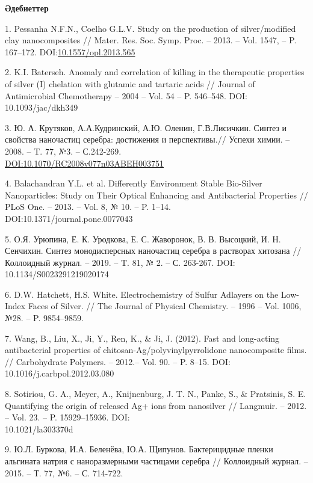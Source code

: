 \begin{center}
{\bfseries Әдебиеттер}
\end{center}

\begin{references}
1. Pessanha N.F.N., Coelho G.L.V. Study on the production of
silver/modified clay nanocomposites // Mater. Res. Soc. Symp. Proc. --
2013. -- Vol. 1547, -- P. 167--172.
DOI:\href{http://dx.doi.org/10.1557/opl.2013.565}{10.1557/opl.2013.565}

2. K.I. Baterseh. Anomaly and correlation of killing in the therapeutic
properties of silver (I) chelation with glutamic and tartaric acids //
Journal of Antimicrobial Chemotherapy -- 2004 -- Vol. 54 -- P.
546--548. DOI: 10.1093/jac/dkh349

3. Ю. А. Крутяков, А.А.Кудринский, А.Ю. Оленин, Г.В.Лисичкин. Синтез и
свойства наночастиц серебра: достижения и перспективы.// Успехи химии.
-- 2008. -- T. 77, №3. -- С.242-269.
\\\href{https://doi.org/10.1070/RC2008v077n03ABEH003751}{DOI:10.1070/RC2008v077n03ABEH003751}

4. Balachandran Y.L. et al. Differently Environment Stable Bio-Silver
Nanoparticles: Study on Their Optical Enhancing and Antibacterial
Properties // PLoS One. -- 2013. -- Vol. 8, № 10. -- P. 1--14.
\\DOI:10.1371/journal.pone.0077043

5. О.Я. Урюпина, Е. К. Уродкова, Е. С. Жаворонок, В. В. Высоцкий, И. Н.
Сенчихин. Синтез монодисперсных наночастиц серебра в растворах
хитозана // Коллоидный журнал. -- 2019. -- T. 81, № 2. -- С. 263-267.
DOI: 10.1134/S0023291219020174

6. D.W. Hatchett, H.S. White. Electrochemistry of Sulfur Adlayers on the
Low-Index Faces of Silver. // The Journal of Physical Chemistry. --
1996 -- Vol. 1006, №28. -- P. 9854--9859.

7. Wang, B., Liu, X., Ji, Y., Ren, K., \& Ji, J. (2012). Fast and
long-acting antibacterial properties of
chitosan-Ag/polyvinylpyrrolidone nanocomposite films. // Carbohydrate
Polymers. -- 2012.-- Vol. 90. -- P. 8--15. DOI:
10.1016/j.carbpol.2012.03.080

8. Sotiriou, G. A., Meyer, A., Knijnenburg, J. T. N., Panke, S., \&
Pratsinis, S. E. Quantifying the origin of released Ag+ ions from
nanosilver // Langmuir. -- 2012. -- Vol. 23. -- P. 15929--15936. DOI:
\\10.1021/la303370d

9. Ю.Л. Буркова, И.А. Беленёва, Ю.А. Щипунов. Бактерицидные пленки
альгината натрия с наноразмерными частицами серебра // Коллоидный
журнал. -- 2015. -- Т. 77, №6. -- С. 714-722.


\end{references}
